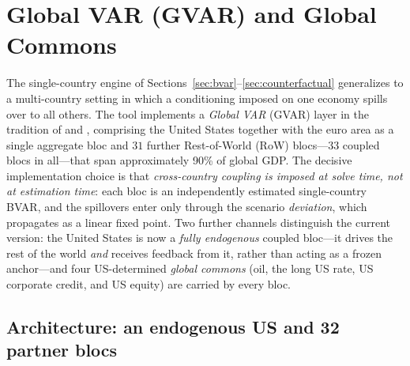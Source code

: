 \documentclass[11pt]{article}
\theoremstyle{definition}
\theoremstyle{remark}
\begin{document}
\section{Global VAR (GVAR) and Global Commons}\label{sec:gvar}

The single-country engine of Sections~\ref{sec:bvar}--\ref{sec:counterfactual}
generalizes to a multi-country setting in which a conditioning imposed on one
economy spills over to all others. The tool implements a \emph{Global VAR}
(GVAR) layer in the tradition of \citet{PesaranSchuermannWeiner2004} and
\citet{DeesDiMauroPesaranSmith2007}, comprising the United States together with
the euro area as a single aggregate bloc and $31$ further Rest-of-World (RoW)
blocs---$33$ coupled blocs in all---that span approximately 90\% of global GDP.
The decisive implementation choice is that \emph{cross-country coupling is
imposed at solve time, not at estimation time}: each bloc is an independently
estimated single-country BVAR, and the spillovers enter only through the scenario
\emph{deviation}, which propagates as a linear fixed point. Two further channels
distinguish the current version: the United States is now a \emph{fully
endogenous} coupled bloc---it drives the rest of the world \emph{and} receives
feedback from it, rather than acting as a frozen anchor---and four US-determined
\emph{global commons} (oil, the long US rate, US corporate credit, and US equity)
are carried by every bloc.

\subsection{Architecture: an endogenous US and 32 partner blocs}\label{sec:gvar:arch}
\end{document}
